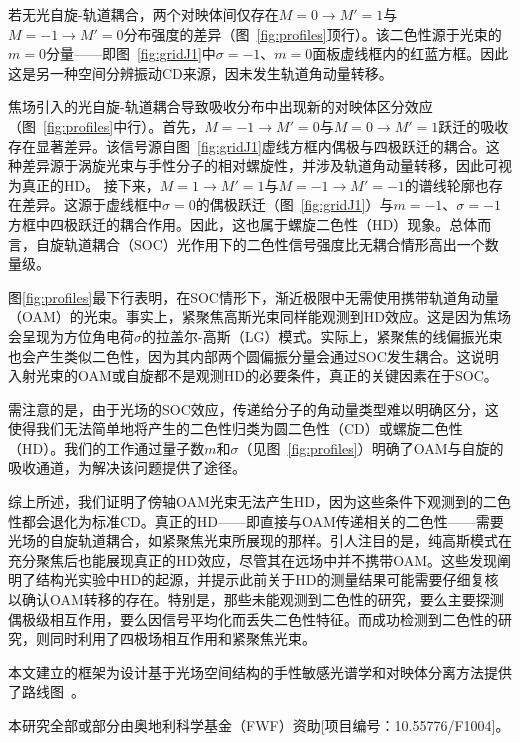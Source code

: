 \documentclass[reprint,aps,prl,twocolumn,superscriptaddress,groupedaddress]{revtex4-2}
\begin{document}
若无光自旋-轨道耦合，两个对映体间仅存在$M=0\to M'=1$与$M=-1\to M'=0$分布强度的差异（图~\ref{fig:profiles}顶行）。该二色性源于光束的$m=0$分量——即图~\ref{fig:gridJ1}中$\sigma=-1$、$m=0$面板虚线框内的红蓝方框。因此这是另一种空间分辨振动CD来源，因未发生轨道角动量转移。

焦场引入的光自旋-轨道耦合导致吸收分布中出现新的对映体区分效应（图~\ref{fig:profiles}中行）。首先，$M=-1\to M'=0$与$M=0\to M'=1$跃迁的吸收存在显著差异。该信号源自图~\ref{fig:gridJ1}虚线方框内偶极与四极跃迁的耦合。这种差异源于涡旋光束与手性分子的相对螺旋性，并涉及轨道角动量转移，因此可视为真正的HD。
接下来，$M=1\to M'=1$与$M=-1\to M'=-1$的谱线轮廓也存在差异。这源于虚线框中$\sigma=0$的偶极跃迁（图~\ref{fig:gridJ1}）与$m=-1$、$\sigma=-1$方框中四极跃迁的耦合作用。因此，这也属于螺旋二色性（HD）现象。总体而言，自旋轨道耦合（SOC）光作用下的二色性信号强度比无耦合情形高出一个数量级。

图\ref{fig:profiles}最下行表明，在SOC情形下，渐近极限中无需使用携带轨道角动量（OAM）的光束。事实上，紧聚焦高斯光束同样能观测到HD效应。这是因为焦场会呈现为方位角电荷$\sigma$的拉盖尔-高斯（LG）模式。实际上，紧聚焦的线偏振光束也会产生类似二色性，因为其内部两个圆偏振分量会通过SOC发生耦合。这说明入射光束的OAM或自旋都不是观测HD的必要条件，真正的关键因素在于SOC。

需注意的是，由于光场的SOC效应，传递给分子的角动量类型难以明确区分，这使得我们无法简单地将产生的二色性归类为圆二色性（CD）或螺旋二色性（HD）。我们的工作通过量子数$m$和$\sigma$（见图~\ref{fig:profiles}）明确了OAM与自旋的吸收通道，为解决该问题提供了途径。

综上所述，我们证明了傍轴OAM光束无法产生HD，因为这些条件下观测到的二色性都会退化为标准CD。真正的HD——即直接与OAM传递相关的二色性——需要光场的自旋轨道耦合，如紧聚焦光束所展现的那样。引人注目的是，纯高斯模式在充分聚焦后也能展现真正的HD效应，尽管其在远场中并不携带OAM。这些发现阐明了结构光实验中HD的起源，并提示此前关于HD的测量结果可能需要仔细复核以确认OAM转移的存在。特别是，那些未能观测到二色性的研究，要么主要探测偶极级相互作用\cite{Araoka2005}，要么因信号平均化而丢失二色性特征\cite{Loeffler2011}。而成功检测到二色性的研究，则同时利用了四极场相互作用和紧聚焦光束\cite{Rusak2019,Rouxel2022,Begin2023,Jain2023}。

本文建立的框架为设计基于光场空间结构的手性敏感光谱学和对映体分离方法提供了路线图~\cite{Leibscher2022}。\\
\begin{acknowledgments}
本研究全部或部分由奥地利科学基金（FWF）资助[项目编号：10.55776/F1004]。
\end{acknowledgments}

\end{document}
